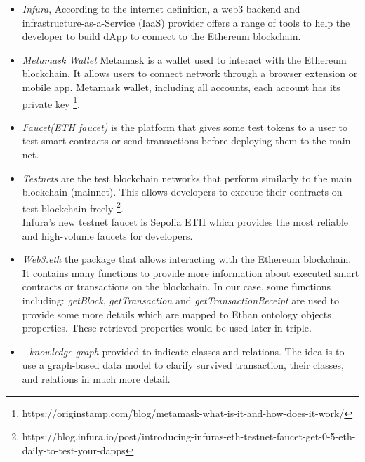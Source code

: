 \begin{itemize}
\item \textit{Infura}, According to the internet definition, a web3 backend and infrastructure-as-a-Service (IaaS) provider offers a range of tools to help the developer to build dApp to connect to the Ethereum blockchain.\\
\item \textit{Metamask Wallet} Metamask is a wallet used to interact with the Ethereum blockchain. It allows users to connect network through a browser extension or mobile app. Metamask wallet, including all accounts, each account has its private key \footnote{https://originstamp.com/blog/metamask-what-is-it-and-how-does-it-work/}.\\
\item \textit{Faucet(ETH faucet)} is the platform that gives some test tokens to a user to test smart contracts or send transactions before deploying them to the main net. \\
\item \textit{Testnets} are the test blockchain networks that perform similarly to the main blockchain (mainnet). This allows developers to execute their contracts on test blockchain freely \footnote{https://blog.infura.io/post/introducing-infuras-eth-testnet-faucet-get-0-5-eth-daily-to-test-your-dapps}.\\
Infura's new testnet faucet is Sepolia ETH which provides the most reliable and high-volume faucets for developers. \\
\item \textit{Web3.eth} the package that allows interacting with the Ethereum blockchain. It contains many functions to provide more information about executed smart contracts or transactions on the blockchain. 
In our case, some functions including: \textit{getBlock}, \textit{getTransaction} and \textit{getTransactionReceipt} are used to provide some more details which are mapped to Ethan ontology objects properties. These retrieved properties would be used later in triple.\\
\item \textit{- knowledge graph} provided to indicate classes and relations.
The idea is to use a graph-based data model to clarify survived transaction, their classes, and relations in much more detail. 
\begin{center}
	
	\begin{figure}[htb!]
		
		\begin{minipage}{0.75\linewidth}
			

\end{minipage}
\end{figure}
\end{center}
\end{itemize}
